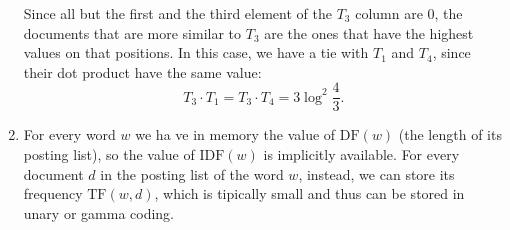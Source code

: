 \begin{enumerate}
  Since all but the first and the third element of the $T_3$ column are 0, the
  documents that are more similar to $T_3$ are the ones that have the highest
  values on that positions. In this case, we have a tie with $T_1$ and $T_4$,
  since their dot product have the same value: $$ T_3 \cdot T_1 = T_3 \cdot T_4
  = 3\log^2\frac{4}{3}.$$

  \item For every word $w$ we ha ve in memory the value of $\text{DF}(w)$ (the
  length of its posting list), so the value of $\text{IDF}(w)$ is implicitly
  available.  For every document $d$ in the posting list of the word $w$,
  instead, we can store its frequency $\text{TF}(w, d)$, which is tipically
  small and thus can be stored in unary or gamma coding.

\end{enumerate}
